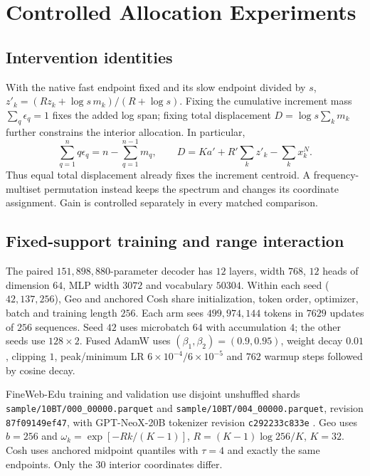 \section{Controlled Allocation Experiments}
\label{sec:identification-details}
\subsection{Intervention identities}
With the native fast endpoint fixed and its slow endpoint divided by $s$,
$z'_k=(Rz_k+\log s\,m_k)/(R+\log s)$. Fixing the cumulative increment mass
$\sum_q\epsilon_q=1$ fixes the added log span; fixing total displacement
$D=\log s\sum_km_k$ further constrains the interior allocation. In particular,
\begin{equation}
\sum_{q=1}^n q\epsilon_q=n-\sum_{q=1}^{n-1}m_q,
\qquad D=Ka'+R'\sum_kz'_k-\sum_kx_k^N.
\label{eq:displacement-centroid}
\end{equation}
Thus equal total displacement already fixes the increment centroid. A
frequency-multiset permutation instead keeps the spectrum and changes its
coordinate assignment. Gain is controlled separately in every matched comparison.

\subsection{Fixed-support training and range interaction}
\label{sec:exact-range-control}
The paired $151{,}898{,}880$-parameter decoder has $12$ layers, width $768$,
$12$ heads of dimension $64$, MLP width $3072$ and vocabulary $50304$.
Within each seed ($42,137,256$), Geo and anchored Cosh share initialization,
token order, optimizer, batch and training length $256$. Each arm sees
$499{,}974{,}144$ tokens in $7629$ updates of $256$ sequences. Seed $42$
uses microbatch $64$ with accumulation $4$; the other seeds use $128\times2$.
Fused AdamW uses $(\beta_1,\beta_2)=(0.9,0.95)$, weight decay $0.01$,
clipping $1$, peak/minimum LR $6\times10^{-4}/6\times10^{-5}$ and $762$
warmup steps followed by cosine decay.

FineWeb-Edu training and validation use disjoint unshuffled shards
\texttt{sample/10BT/000\_00000.parquet} and
\texttt{sample/10BT/004\_00000.parquet}, revision \texttt{87f09149ef47},
with GPT-NeoX-20B tokenizer revision \texttt{c292233c833e}
\citep{penedo2024fineweb,black2022gptneox}. Geo uses $b=256$ and
$\omega_k=\exp[-Rk/(K-1)]$, $R=(K-1)\log256/K$, $K=32$.
Cosh uses anchored midpoint quantiles with $\tau=4$ and exactly the same
endpoints. Only the $30$ interior coordinates differ.

